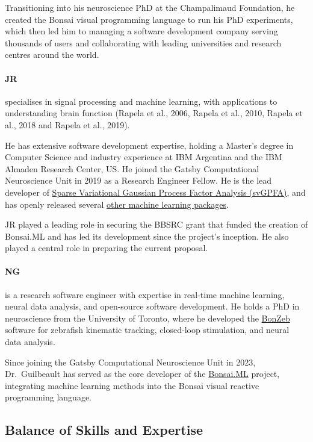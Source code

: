 Transitioning into his neuroscience PhD at the Champalimaud Foundation, he
created the Bonsai visual programming language to run his PhD experiments,
which then led him to managing a software development company serving thousands
of users and collaborating with leading universities and research centres
around the world.

\paragraph{JR} specialises in
signal processing and machine learning, with applications to understanding
brain function (Rapela et al., 2006, Rapela et al., 2010, Rapela et al., 2018
and Rapela et al., 2019).

He has extensive software development expertise, holding a Master’s degree in
Computer Science and industry experience at IBM Argentina and the IBM Almaden
Research Center, US.
%
He joined the Gatsby Computational Neuroscience Unit in 2019 as a Research
Engineer Fellow.
%
He is the lead developer of \href{https://github.com/joacorapela/svGPFA}{Sparse
Variational Gaussian Process Factor Analysis (svGPFA)}, and has openly released
several \href{https://github.com/joacorapela}{other machine learning packages}.

JR played a leading role in securing the BBSRC grant that funded the
creation of Bonsai.ML and has led its development since the project’s
inception. He also played a central role in preparing the current proposal.

\paragraph{NG} is a research software engineer with expertise in real-time
machine learning, neural data analysis, and open-source software development.
He holds a PhD in neuroscience from the University of Toronto, where he
developed the \href{https://ncguilbeault.github.io/BonZeb/}{BonZeb} software
for zebrafish kinematic tracking, closed-loop stimulation, and neural data
analysis.

Since joining the Gatsby Computational Neuroscience Unit in 2023,
Dr.~Guilbeault has served as the core developer of the
\href{https://bonsai-rx.org/machinelearning}{Bonsai.ML} project, integrating
machine learning methods into the Bonsai visual reactive programming language.

\subsection{Balance of Skills and Expertise}

